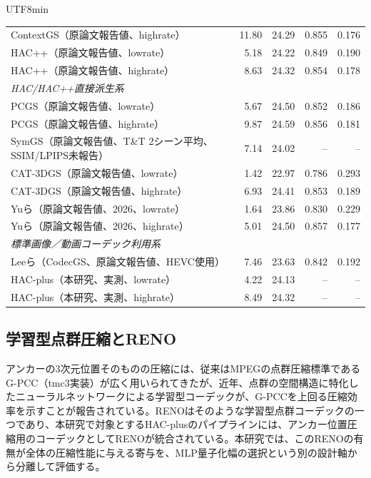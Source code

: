 \documentclass{ieeeaccess}
\begin{document}
\begin{CJK}{UTF8}{min}
\begin{table}[!t]
\begin{tabular}{lrrrr}
ContextGS\cite{wang2024contextgs}（原論文報告値、highrate） & 11.80 & 24.29 & 0.855 & 0.176 \\
HAC++\cite{chen2025hacpp}（原論文報告値、lowrate） & 5.18 & 24.22 & 0.849 & 0.190 \\
HAC++\cite{chen2025hacpp}（原論文報告値、highrate） & 8.63 & 24.32 & 0.854 & 0.178 \\
\multicolumn{5}{l}{\textit{HAC/HAC++直接派生系}} \\
PCGS\cite{chen2025pcgs}（原論文報告値、lowrate） & 5.67 & 24.50 & 0.852 & 0.186 \\
PCGS\cite{chen2025pcgs}（原論文報告値、highrate） & 9.87 & 24.59 & 0.856 & 0.181 \\
SymGS\cite{gupta2025symgs}（原論文報告値、T\&T 2シーン平均、SSIM/LPIPS未報告） & 7.14 & 24.02 & -- & -- \\
CAT-3DGS\cite{zhan2025cat3dgs}（原論文報告値、lowrate） & 1.42 & 22.97 & 0.786 & 0.293 \\
CAT-3DGS\cite{zhan2025cat3dgs}（原論文報告値、highrate） & 6.93 & 24.41 & 0.853 & 0.189 \\
Yuら\cite{yu2026practical}（原論文報告値、2026、lowrate） & 1.64 & 23.86 & 0.830 & 0.229 \\
Yuら\cite{yu2026practical}（原論文報告値、2026、highrate） & 5.01 & 24.50 & 0.857 & 0.177 \\
\multicolumn{5}{l}{\textit{標準画像／動画コーデック利用系}} \\
Leeら\cite{lee2025codecgs}（CodecGS、原論文報告値、HEVC使用） & 7.46 & 23.63 & 0.842 & 0.192 \\
\midrule
HAC-plus（本研究、実測、lowrate） & 4.22 & 24.13 & -- & -- \\
HAC-plus（本研究、実測、highrate） & 8.49 & 24.32 & -- & -- \\
\bottomrule
\end{tabular}
\end{table}

\subsection{学習型点群圧縮とRENO}
アンカーの3次元位置そのものの圧縮には、従来はMPEGの点群圧縮標準であるG-PCC（tmc3実装）\cite{gpcc}が広く用いられてきたが、近年、点群の空間構造に特化したニューラルネットワークによる学習型コーデックが、G-PCCを上回る圧縮効率を示すことが報告されている。RENO\cite{reno}はそのような学習型点群コーデックの一つであり、本研究で対象とするHAC-plusのパイプラインには、アンカー位置圧縮用のコーデックとしてRENOが統合されている。本研究では、このRENOの有無が全体の圧縮性能に与える寄与を、MLP量子化幅の選択という別の設計軸から分離して評価する。


\end{CJK}
\end{document}
